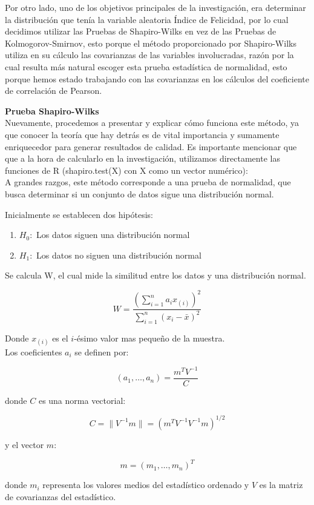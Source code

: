 Por otro lado, uno de los objetivos principales de la investigación, era determinar la distribución que tenía la variable aleatoria Índice de Felicidad, por lo cual decidimos utilizar las Pruebas de Shapiro-Wilks en vez de las Pruebas de Kolmogorov-Smirnov, esto porque el método proporcionado por Shapiro-Wilks utiliza en su cálculo las covarianzas de las variables involucradas, razón por la cual resulta más natural escoger esta prueba estadística de normalidad, esto porque hemos estado trabajando con las covarianzas en los cálculos del coeficiente de correlación de Pearson. \\

\pagebreak

\textbf{Prueba Shapiro-Wilks} \\

Nuevamente, procedemos a presentar y explicar cómo funciona este método, ya que conocer la teoría que hay detrás es de vital importancia y sumamente enriquecedor para generar resultados de calidad. Es importante mencionar que que a la hora de calcularlo en la investigación, utilizamos directamente las funciones de R (shapiro.test(X) con X como un vector numérico): \\

A grandes razgos, este método corresponde a una prueba de normalidad, que busca determinar si un conjunto de datos sigue una distribución normal. \\

    \begin{theorem} 
    
        Inicialmente se establecen dos hipótesis:

        \begin{enumerate}
            \item $H_0:$ Los datos siguen una distribución normal
            \item $H_1:$ Los datos no siguen una distribución normal
        \end{enumerate}
    
        Se calcula W, el cual mide la similitud entre los datos y una distribución normal.
    
        $$W = \frac{\left(\sum_{i=1}^n a_i x_{(i)}\right)^2}{\sum_{i=1}^n (x_i - \bar{x})^2}$$
    
        Donde $x_{(i)}$ es el $i$-ésimo valor mas pequeño de la muestra. \\
    
        Los coeficientes $a_i$ se definen por:
    
        $$(a_1, \ldots, a_n) = \frac{m^T V^{-1}}{C}$$
    
        donde $C$ es una norma vectorial:
        
        $$C = \| V^{-1} m \| = (m^T V^{-1} V^{-1} m)^{1/2}$$
        
        y el vector $m$:
    
        $$m = (m_1, \ldots, m_n)^T$$
    
        donde $m_i$ representa los valores medios del estadístico ordenado
        y $V$ es la matriz de covarianzas del estadístico.
        
    \end{theorem}
\pagebreak

